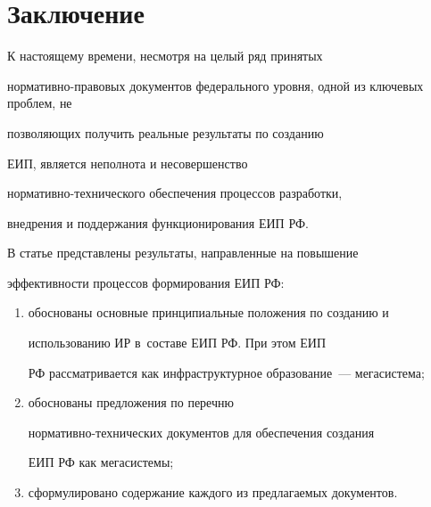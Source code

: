      \section{Заключение}



     К настоящему времени, несмотря на целый ряд принятых

     норма\-тив\-но-пра\-во\-вых документов федерального уровня, одной из ключевых проблем, не

позволяющих получить реальные результаты по созданию

ЕИП, является неполнота и несовершенство

     нор\-ма\-тив\-но-тех\-ни\-че\-ско\-го обеспечения процессов разработки,

внедрения и поддержания функционирования ЕИП РФ.



     В статье представлены результаты, направленные на повышение

эффективности процессов формирования ЕИП РФ:

     \begin{enumerate}[(1)]

     \item обоснованы основные принципиальные положения по созданию и

использованию ИР в~составе ЕИП РФ. При этом ЕИП

РФ рассматривается как инфраструктурное образование~--- мегасистема;

     \item обоснованы предложения по перечню

     нор\-ма\-тив\-но-тех\-ни\-че\-ских документов для обеспечения создания

ЕИП РФ как мегасистемы;

     \item сформулировано содержание каждого из предлагаемых документов.

     \end{enumerate}



